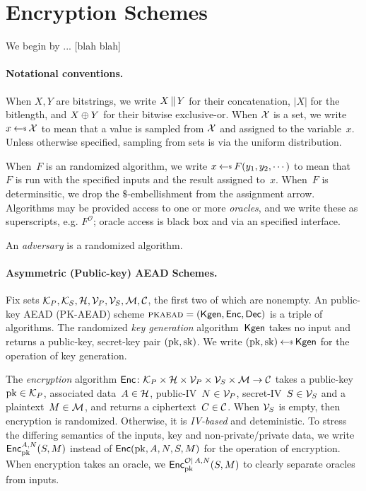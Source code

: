 \section{Encryption Schemes}
\label{sec:prelims}
\label{sec:encryption}
We begin by ... [blah blah]

\paragraph{Notational conventions. }When $X,Y$ are bitstrings, we write $X \concat Y$ for their concatenation, $|X|$ for the bitlength, and $X\xor Y$ for their bitwise exclusive-or.  When $\calX$ is a set, we write $x \getsr \calX$ to mean that a value is sampled from $\calX$ and assigned to the variable~$x$.  Unless otherwise specified, sampling from sets is via the uniform distribution.

When~$F$ is an randomized algorithm, we write $x \getsr F(y_1,y_2,\cdots)$ to mean that~$F$ is run with the specified inputs and the result assigned to~$x$.  When~$F$ is determinsitic, we drop the $\$$-embellishment from the assignment arrow.  Algorithms may be provided access to one or more \emph{oracles}, and we write these as superscripts, e.g. $F^{\mathcal{O}}$; oracle access is black box and via an specified interface.  

An \emph{adversary} is a randomized algorithm.

\paragraph{Asymmetric (Public-key) AEAD Schemes. }
Fix sets $\pubkeys, \seckeys, \adata, \pubivs, \secivs, \ptxts,
\ctxts$, the first two of which are nonempty.  An public-key AEAD
(PK-AEAD) scheme $\pkaead=(\Kgen,\Enc,\Dec)$ is a triple of algorithms.  The randomized \emph{key generation} algorithm~$\Kgen$ takes no input and returns a public-key, secret-key pair $(\pk,\sk)$.  We write $(\pk,\sk)\getsr\Kgen$ for the operation of key generation.

The \emph{encryption} algorithm $\Enc \colon \pubkeys \times \adata \times \pubivs \times \secivs \times \ptxts \to \ctxts$ takes a public-key~$\pk\in\pubkeys$, associated data~$\header \in \adata$, public-IV~$\pubiv \in \pubivs$, secret-IV~$\seciv \in \secivs$ and a plaintext~$M \in \ptxts$, and returns a ciphertext~$C \in \ctxts$. 
When $\secivs$ is empty, then encryption is randomized.  Otherwise, it is \emph{IV-based} and deteministic.
To stress the differing semantics of the inputs, key and non-private/private data, we write $\Encprim{\pk}{\header,\pubiv}{S,M}$ instead of $\Enc(\pk,\header,\pubiv,\seciv,M)$ for the operation of encryption.  When encryption takes an oracle, we $\EncprimO{\pk}{\header,\pubiv}{\seciv,M}{\mathcal{O}}$ to clearly separate oracles from inputs.

